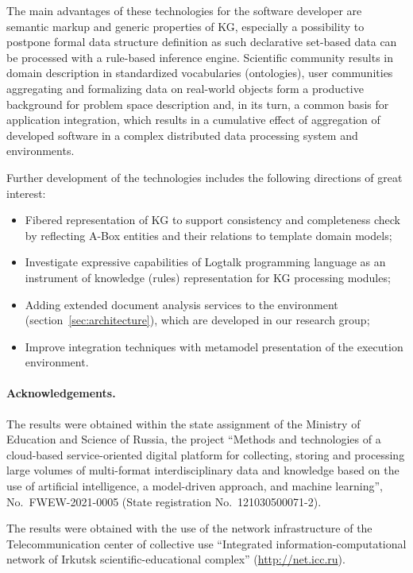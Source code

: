 \documentclass[a4paper]{jctart19a}
\begin{document}
The main advantages of these technologies for the software developer are semantic markup and generic properties of KG, especially a possibility to postpone formal data structure definition as such declarative set-based data can be processed with a rule-based inference engine.  Scientific community results in domain description in standardized vocabularies (ontologies), user communities aggregating and formalizing data on real-world objects form a productive background for problem space description and,  in its turn, a common basis for application integration, which results in a cumulative effect of aggregation of developed software in a complex distributed data processing system and environments.

Further development of the technologies includes the following directions of great interest:
\begin{itemize}
\item Fibered representation of KG to support consistency and completeness check by reflecting A-Box entities and their relations to template domain models;
\item Investigate expressive capabilities of Logtalk programming language as an instrument of knowledge (rules) representation for KG processing modules;
\item Adding extended document analysis services \cite{shigpaper} to the environment (section~\ref{sec:architecture}), which are developed in our research group;
\item Improve integration techniques with metamodel presentation of the execution environment.
\end{itemize}

\pagebreak

\paragraph{\small Acknowledgements.}\hspace*{-3.5mm} The results were obtained within the state assignment of the Ministry of Education and Science of Russia, the project ``Methods and technologies of a cloud-based service-oriented digital platform for collecting, storing and processing large volumes of multi-format interdisciplinary data and knowledge based on the use of artificial intelligence, a model-driven approach, and machine learning'', No.~FWEW-2021-0005 (State registration No.~121030500071-2).

The results were obtained with the use of the network infrastructure of the Telecommunication center of collective use ``Integrated information-computational network of Irkutsk scientific-educational complex'' (\url{http://net.icc.ru}).
\end{document}
